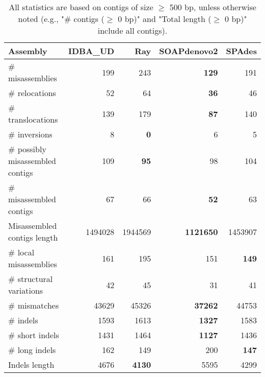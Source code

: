 \documentclass[12pt,a4paper]{article}
\begin{document}
\begin{table}[ht]
\begin{center}
\caption{All statistics are based on contigs of size $\geq$ 500 bp, unless otherwise noted (e.g., "\# contigs ($\geq$ 0 bp)" and "Total length ($\geq$ 0 bp)" include all contigs).}
\begin{tabular}{|l*{4}{|r}|}
\hline
Assembly & IDBA\_UD & Ray & SOAPdenovo2 & SPAdes \\ \hline
\# misassemblies & 199 & 243 & {\bf 129} & 191 \\ \hline
\hspace{5mm}\# relocations & 52 & 64 & {\bf 36} & 46 \\ \hline
\hspace{5mm}\# translocations & 139 & 179 & {\bf 87} & 140 \\ \hline
\hspace{5mm}\# inversions & 8 & {\bf 0} & 6 & 5 \\ \hline
\# possibly misassembled contigs & 109 & {\bf 95} & 98 & 104 \\ \hline
\# misassembled contigs & 67 & 66 & {\bf 52} & 63 \\ \hline
Misassembled contigs length & 1494028 & 1944569 & {\bf 1121650} & 1453907 \\ \hline
\# local misassemblies & 161 & 195 & 151 & {\bf 149} \\ \hline
\# structural variations & 42 & 45 & 31 & 41 \\ \hline
\# mismatches & 43629 & 45326 & {\bf 37262} & 44753 \\ \hline
\# indels & 1593 & 1613 & {\bf 1327} & 1583 \\ \hline
\hspace{5mm}\# short indels & 1431 & 1464 & {\bf 1127} & 1436 \\ \hline
\hspace{5mm}\# long indels & 162 & 149 & 200 & {\bf 147} \\ \hline
Indels length & 4676 & {\bf 4130} & 5595 & 4299 \\ \hline
\end{tabular}
\end{center}
\end{table}
\end{document}
